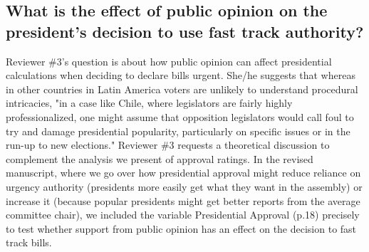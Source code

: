 \documentclass[article,letterpaper,times,12pt,listings-bw,microtype]{article}
\begin{document}

\subsection{What is the effect of public opinion on the president's decision to use fast track authority?}
Reviewer \#3's question is about how public opinion can affect presidential calculations when deciding to declare bills urgent. She/he suggests that whereas in other countries in Latin America voters are unlikely to understand procedural intricacies, "in a case like Chile, where legislators are fairly highly professionalized, one might assume that opposition legislators would call foul to try and damage presidential popularity, particularly on specific issues or in the run-up to new elections." Reviewer \#3 requests a theoretical discussion to complement the analysis we present of approval ratings. In the revised manuscript, where we go over how presidential approval might reduce reliance on urgency authority (presidents more easily get what they want in the assembly) or increase it (because popular presidents might get better reports from the average committee chair), we included the variable Presidential Approval (p.18) precisely to test whether support from public opinion has an effect on the decision to fast track bills. 
\end{document}
